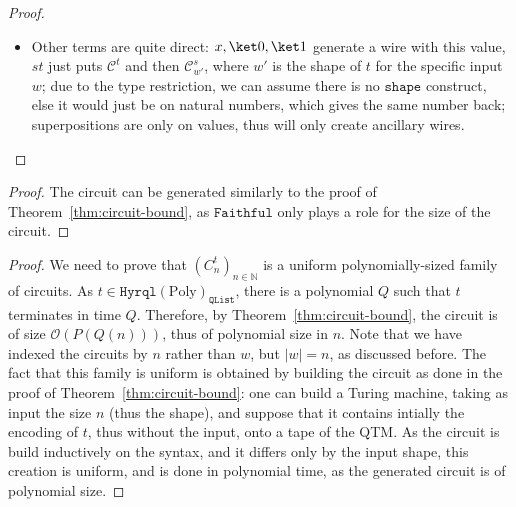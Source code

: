 \documentclass[10pt,a4paper]{article}
\newcommand{\textshape}{\ensuremath{\mathtt{shape}}}
\newcommand{\zket}{\ket 0}
\newcommand{\oket}{\ket 1}
\newcommand{\fbqpscript}{\mathtt{QList}}
\newcommand{\hyrqlbound}[1]{\ensuremath{\mathtt{Hyrql}({#1})}}
\newcommand{\hyrqlpoly}{\hyrqlbound{\mathrm{Poly}}_\fbqpscript}
\newcommand{\boundedrec}{\ensuremath{\mathtt{Faithful}}}
\newcommand{\size}[1]{|#1|}
\newcommand{\bigo}[1]{\mathcal O({#1})}
\newcommand{\mbN}{\mathbb N}
\newcommand{\mcC}{\mathcal C}
\begin{document}
\begin{proof}
\begin{itemize}
      $\mcC_{w'}^s$, replacing the box $f$ in our circuit, but for the
      new corresponding input shape $w'$. Such process will terminate, as $t$
      terminates, thus there is only a finite number of recursive calls.
      In the worst case, we have added $T(k)$ circuits, thus the total size is
      $T(k)P(T(k)) = P'(T(k))$, for $P' = XP \in \mbN[X]$.
    \item Other terms are quite direct: $x, \zket, \oket$ generate a wire with
      this value, $st$ just puts $\mcC^t$ and then $\mcC_{w'}^s$, where $w'$ is
      the shape of $t$ for the specific input $w$; due to the type restriction,
      we can assume there is no $\textshape{}$ construct, else it would just be
      on natural numbers, which gives the same number back; superpositions are
      only on values, thus will only create ancillary wires. \qedhere
  \end{itemize}
\end{proof}

\circuitexistence*

\begin{proof}
  The circuit can be generated similarly to the proof of
  Theorem~\ref{thm:circuit-bound}, as \boundedrec{} only plays a role for the
  size of the circuit.
\end{proof}

\fbqpsound*

\begin{proof}
  We need to prove that $(C_n^t)_{n \in \mbN}$ is a uniform polynomially-sized
  family of circuits. As $t \in \hyrqlpoly$, there is a polynomial $Q$ such
  that $t$ terminates in time $Q$. Therefore, by
  Theorem~\ref{thm:circuit-bound}, the circuit is of size $\bigo{P(Q(n))}$,
  thus of polynomial size in $n$. Note that we have indexed the circuits by $n$
  rather than $w$, but $\size w = n$, as discussed before. The fact that this
  family is uniform is obtained by building the circuit as done in the proof of
  Theorem~\ref{thm:circuit-bound}: one can build a Turing machine, taking as
  input the size $n$ (thus the shape), and suppose that it contains intially
  the encoding of $t$, thus without the input, onto a tape of the QTM. As the
  circuit is build inductively on the syntax, and it differs only by the input
  shape, this creation is uniform, and is done in polynomial time, as the
  generated circuit is of polynomial size.
\end{proof}

\fbqpcomplete*
\end{document}
